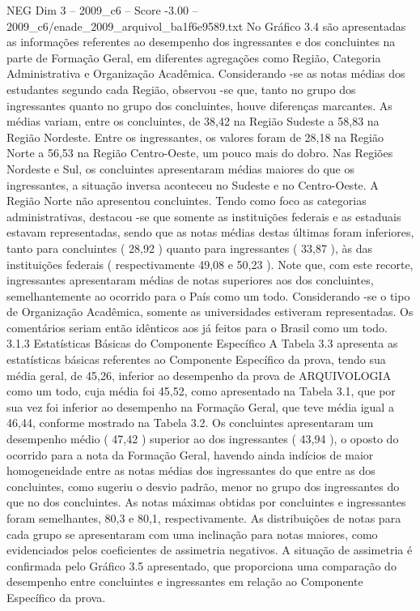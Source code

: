 \begin{textsample}{NEG Dim 3 – 2009\_c6 – Score -3.00 – 2009\_c6/enade\_2009\_arquivol\_ba1f6e9589.txt}
No Gráfico 3.4 são apresentadas as informações referentes ao desempenho dos ingressantes e dos concluintes na parte de Formação Geral, em diferentes agregações como Região, Categoria Administrativa e Organização Acadêmica.
Considerando -se as notas médias dos estudantes segundo cada Região, observou -se que, tanto no grupo dos ingressantes quanto no grupo dos concluintes, houve diferenças marcantes.
As médias variam, entre os concluintes, de 38,42 na Região Sudeste a 58,83 na Região Nordeste.
Entre os ingressantes, os valores foram de 28,18 na Região Norte a 56,53 na Região Centro-Oeste, um pouco mais do dobro.
Nas Regiões Nordeste e Sul, os concluintes apresentaram médias maiores do que os ingressantes, a situação inversa aconteceu no Sudeste e no Centro-Oeste.
A Região Norte não apresentou concluintes.
Tendo como foco as categorias administrativas, destacou -se que somente as instituições federais e as estaduais estavam representadas, sendo que as notas médias destas últimas foram inferiores, tanto para concluintes ( 28,92 ) quanto para ingressantes ( 33,87 ), às das instituições federais ( respectivamente 49,08 e 50,23 ).
Note que, com este recorte, ingressantes apresentaram médias de notas superiores aos dos concluintes, semelhantemente ao ocorrido para o País como um todo.
Considerando -se o tipo de Organização Acadêmica, somente as universidades estiveram representadas.
Os comentários seriam então idênticos aos já feitos para o Brasil como um todo. 3.1.3 Estatísticas Básicas do Componente Específico A Tabela 3.3 apresenta as estatísticas básicas referentes ao Componente Específico da prova, tendo sua média geral, de 45,26, inferior ao desempenho da prova de ARQUIVOLOGIA como um todo, cuja média foi 45,52, como apresentado na Tabela 3.1, que por sua vez foi inferior ao desempenho na Formação Geral, que teve média igual a 46,44, conforme mostrado na Tabela 3.2.
Os concluintes apresentaram um desempenho médio ( 47,42 ) superior ao dos ingressantes ( 43,94 ), o oposto do ocorrido para a nota da Formação Geral, havendo ainda indícios de maior homogeneidade entre as notas médias dos ingressantes do que entre as dos concluintes, como sugeriu o desvio padrão, menor no grupo dos ingressantes do que no dos concluintes.
As notas máximas obtidas por concluintes e ingressantes foram semelhantes, 80,3 e 80,1, respectivamente.
As distribuições de notas para cada grupo se apresentaram com uma inclinação para notas maiores, como evidenciados pelos coeficientes de assimetria negativos.
A situação de assimetria é confirmada pelo Gráfico 3.5 apresentado, que proporciona uma comparação do desempenho entre concluintes e ingressantes em relação ao Componente Específico da prova.

\end{textsample}
